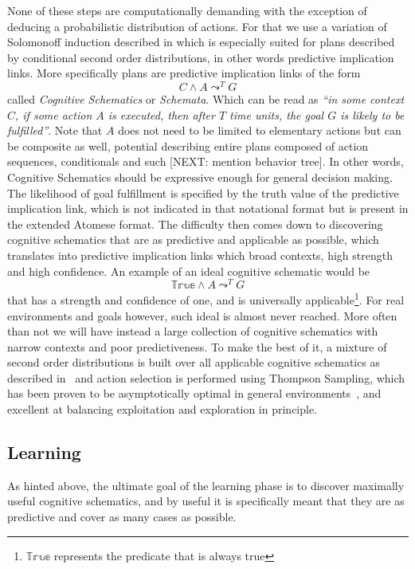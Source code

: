 \documentclass[runningheads]{llncs}
\newcommand{\lpreimp}[1]{\leadsto^{#1}}
\begin{document}
None of these steps are computationally demanding with the exception
of deducing a probabilistic distribution of actions.  For that we use
a variation of Solomonoff induction described in
\cite{Geisweiller2018} which is especially suited for plans described
by conditional second order distributions, in other words predictive
implication links.  More specifically plans are predictive implication
links of the form
$$C \land A \lpreimp{T} G$$
called \emph{Cognitive Schematics} or \emph{Schemata}.  Which can be
read as \emph{``in some context $C$, if some action $A$ is executed,
  then after $T$ time units, the goal $G$ is likely to be
  fulfilled''}.  Note that $A$ does not need to be limited to
elementary actions but can be composite as well, potential describing
entire plans composed of action sequences, conditionals and such
[NEXT: mention behavior tree].  In other words, Cognitive Schematics
should be expressive enough for general decision making.  The
likelihood of goal fulfillment is specified by the truth value of the
predictive implication link, which is not indicated in that notational
format but is present in the extended Atomese format.  The difficulty
then comes down to discovering cognitive schematics that are as
predictive and applicable as possible, which translates into
predictive implication links which broad contexts, high strength and
high confidence.  An example of an ideal cognitive schematic would be
$$\mathbb{True} \land A \lpreimp{T} G$$
that has a strength and confidence of one, and is universally
applicable\footnote{$\mathbb{True}$ represents the predicate that is
  always true}.  For real environments and goals however, such ideal
is almost never reached.  More often than not we will have instead a
large collection of cognitive schematics with narrow contexts and poor
predictiveness.  To make the best of it, a mixture of second order
distributions is built over all applicable cognitive schematics as
described in~\cite{Geisweiller2018} and action selection is performed
using Thompson Sampling, which has been proven to be asymptotically
optimal in general environments~\cite{Leike2016}, and excellent at
balancing exploitation and exploration in principle.

\subsection{Learning}
As hinted above, the ultimate goal of the learning phase is to
discover maximally useful cognitive schematics, and by useful it is
specifically meant that they are as predictive and cover as many cases
as possible.
\end{document}
